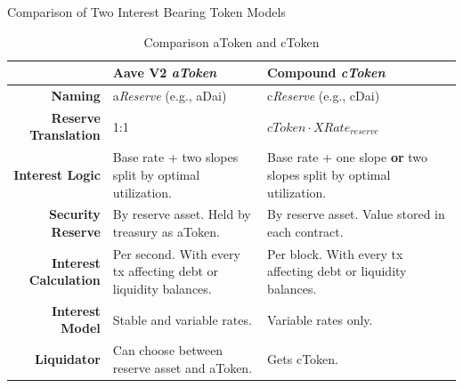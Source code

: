 \documentclass[handout]{beamer}
\begin{document}
\begin{frame}{Comparison of Two Interest Bearing Token Models}

\footnotesize
\begin{table}
  \center
  \begin{tabularx}{\textwidth}{rXX}
    \toprule
    ~	& \textbf{Aave V2} \emph{aToken} & \textbf{Compound} \emph{cToken}	\\
    \midrule
    \textbf{Naming} & a\textit{Reserve} (e.g., aDai) & c\textit{Reserve} (e.g., cDai) \vspace{0.5em}\\
    \textbf{Reserve Translation} & 1:1 & $cToken \cdot XRate_{reserve}$ \vspace{0.5em}\\
    \textbf{Interest Logic} & Base rate + two slopes split by optimal utilization. & Base rate + one slope \textbf{or} two slopes split by optimal utilization. \vspace{0.5em}\\
    \textbf{Security Reserve} & By reserve asset. Held by treasury as aToken. & By reserve asset. Value stored in each contract. \vspace{0.5em}\\
    \textbf{Interest Calculation} & Per second. With every tx affecting debt or liquidity balances. & Per block. With every tx affecting debt or liquidity balances. \vspace{0.5em}\\
    \textbf{Interest Model} & Stable and variable rates. & Variable rates only. \vspace{0.5em}\\
    \textbf{Liquidator} & Can choose between reserve asset and aToken. & Gets cToken.\\
    \bottomrule
  \end{tabularx}
  \caption{Comparison aToken and cToken \cite{AaveV2,Compound}}
\end{table}

\end{frame}
\end{document}
